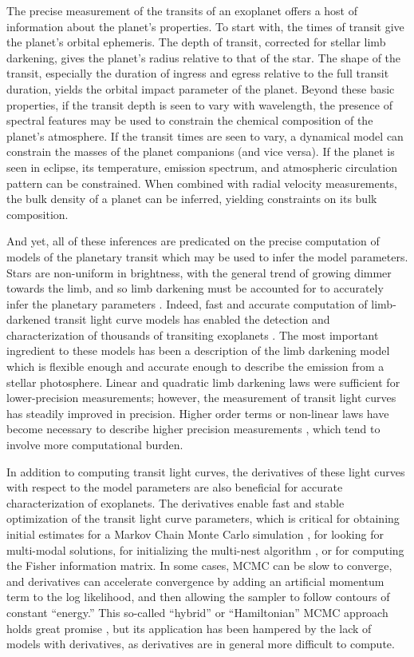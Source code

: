 \documentclass[modern]{aastex61}
\begin{document}
The precise measurement of the transits of an exoplanet offers a host of information
about the planet's properties.  To start with, the times of transit give
the planet's orbital ephemeris.  The depth of transit, corrected for stellar
limb darkening, gives the planet's radius relative to that of the star.   The
shape of the transit, especially the duration of ingress and egress relative to
the full transit duration, yields the orbital impact parameter of the planet.
Beyond these basic properties, if the transit depth is seen to vary with wavelength,
the presence of spectral features may be used to constrain the chemical composition
of the planet's atmosphere.  If the transit times are seen to vary, a dynamical
model can constrain the masses of the planet companions (and vice versa).  If
the planet is seen in eclipse, its temperature, emission spectrum, and atmospheric
circulation pattern can be constrained.  When combined with radial velocity
measurements, the bulk density of a planet can be inferred, yielding constraints
on its bulk composition.

And yet, all of these inferences are predicated on the precise computation of models
of the planetary transit which may be used to infer the model parameters.  Stars 
are non-uniform in brightness, with the general
trend of growing dimmer towards the limb, and so limb darkening must be accounted
for to accurately infer the planetary parameters \citep{Csizmadia2018}.  Indeed, fast
and accurate computation of limb-darkened transit light curve models has enabled the
detection and characterization of thousands of transiting exoplanets \citep{MandelAgol2002}.
The most important ingredient to these models has been a description of the
limb darkening model which is flexible enough and accurate enough to describe the
emission from a stellar photosphere.  Linear and quadratic limb darkening laws
were sufficient for lower-precision measurements; however, the measurement of
transit light curves has steadily improved in precision.  Higher order terms or non-linear laws
have become necessary to describe higher precision measurements \citep{Kopal1950,Claret2000,
Gimenez2006}, which tend to involve more computational burden.

In addition to computing transit light curves, the derivatives of these light
curves with respect to the model parameters are also beneficial for accurate
characterization of exoplanets.   The derivatives enable fast and stable
optimization of the transit light curve parameters, which is critical for
obtaining initial estimates for a Markov Chain Monte Carlo simulation 
\citep[MCMC; e.g.][]{Ford2005,Ford2006},
for looking for multi-modal solutions, for initializing the multi-nest
algorithm \citep{Feroz2008}, or for computing the Fisher information matrix.
In some cases, MCMC can be slow to converge, and derivatives can accelerate
convergence by adding an artificial momentum term to the log likelihood,
and then allowing the sampler to follow contours of constant ``energy.''
This so-called ``hybrid'' or ``Hamiltonian'' MCMC approach holds great promise \citep{Girolami2011,Betancourt2017},
but its application has been hampered by the lack of models with derivatives,
as derivatives are in general more difficult to compute.
\end{document}
